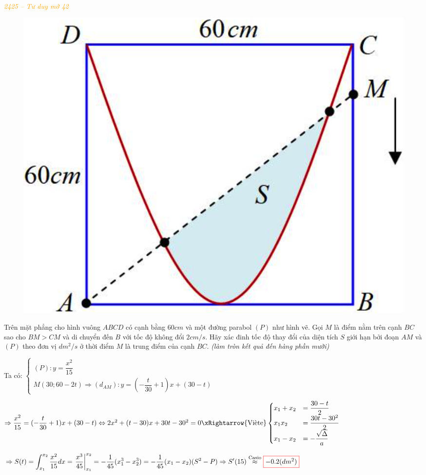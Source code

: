 \documentclass[twoside,final]{hcmut-report}
\newcommand{\exercise}[1]{\begin{exercisebox}#1\end{exercisebox}}
\newcommand{\result}[1]{\fcolorbox{red}{white}{#1}}
\begin{document}
\exercise{
    \textcolor{orange}{\textit{2425 -- Tư duy mở 42}}

    \begin{figure}
        \centering
        \includegraphics*[width=1.05\linewidth]{images/Ứng dụng tích phân/TDM42.png}
    \end{figure}
    Trên mặt phẳng cho hình vuông $ABCD$ có cạnh bằng $60cm$ và một đường parabol $(P)$ như hình vẽ. Gọi $M$ là điểm nằm trên cạnh $BC$ sao cho $BM > CM$ và di chuyển đến $B$ với tốc độ không đổi $2cm/s$. Hãy xác đinh tốc độ thay đổi của diện tích $S$ giới hạn bởi đoạn $AM$ và $(P)$ theo đơn vị $dm^2/s$ ở thời điểm $M$ là trung điểm của cạnh $BC$. \textit{(làm tròn kết quả đến hàng phần mười)}}

Ta có:
$\begin{cases}
        (P):y=\dfrac{x^2}{15} \\
        M(30; 60 - 2t) \Rightarrow (d_{AM}):y=(-\dfrac{t}{30}+1)x + (30-t)
    \end{cases}$\par
$\Rightarrow \dfrac{x^2}{15} = (-\dfrac{t}{30}+1)x + (30-t) \Leftrightarrow 2x^2 + (t - 30)x + 30t - 30^2 = 0 \xRightarrow{\text{Viète}}\begin{cases}
        x_1 + x_2 & =\dfrac{30-t}{2}            \\
        x_1x_2    & =\dfrac{30t-30^2}{2}        \\
        x_1 - x_2 & = -\dfrac{\sqrt{\Delta}}{a}
    \end{cases}$\par
$\Rightarrow S(t) = \displaystyle \int_{x_1}^{x_2}\dfrac{x^2}{15}dx = \left. \frac{x^3}{45} \right|_{x_1}^{x_2} = -\dfrac{1}{45}(x_1^3 - x_2^3) = -\dfrac{1}{45}(x_1-x_2)(S^2 - P) \Rightarrow S'(15) \overset{\text{Casio}}{\approx} \result{$-0.2 (dm^2)$}$
\end{document}
